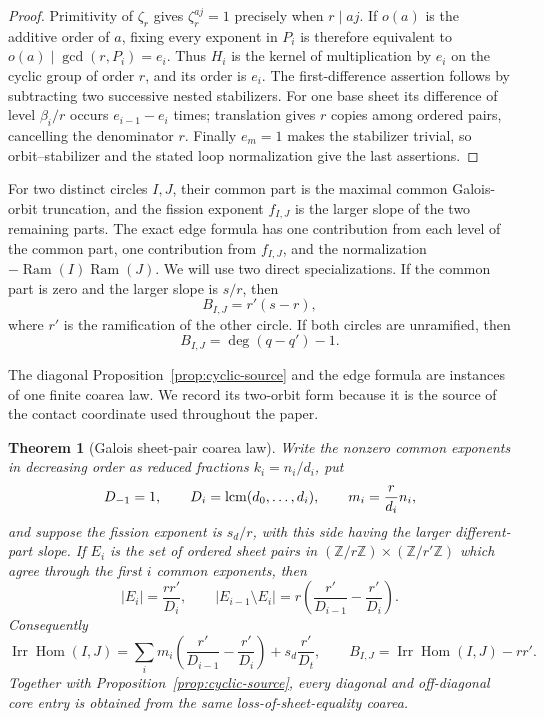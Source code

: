 \documentclass[11pt,a4paper]{amsart}
\theoremstyle{plain}
\newtheorem{theorem}{Theorem}[section]
\theoremstyle{definition}
\newcommand{\ZZ}{\mathbb Z}
\newcommand{\Ram}{\operatorname{Ram}}
\newcommand{\Irr}{\operatorname{Irr}}
\begin{document}
\begin{proof}
Primitivity of $\zeta_r$ gives $\zeta_r^{aj}=1$ precisely when $r\mid aj$.  If $o(a)$ is the
additive order of $a$, fixing every exponent in $P_i$ is therefore equivalent to
$o(a)\mid\gcd(r,P_i)=e_i$.  Thus $H_i$ is the kernel of multiplication by $e_i$ on the cyclic group
of order $r$, and its order is $e_i$.  The first-difference assertion follows by subtracting two
successive nested stabilizers.  For one base sheet its difference of level $\beta_i/r$ occurs
$e_{i-1}-e_i$ times; translation gives $r$ copies among ordered pairs, cancelling the denominator
$r$.  Finally $e_m=1$ makes the stabilizer trivial, so orbit--stabilizer and the stated loop
normalization give the last assertions.
\end{proof}

For two distinct circles $I,J$, their common part is the maximal common Galois-orbit truncation,
and the fission exponent $f_{I,J}$ is the larger slope of the two remaining parts.  The exact edge
formula \cite[Lemma~2.2]{Doucot2025Graphs} has one contribution from each level of the common part,
one contribution from $f_{I,J}$, and the normalization $-\Ram(I)\Ram(J)$.  We will use two direct
specializations.  If the common part is zero and the larger slope is $s/r$, then
\begin{equation}\label{eq:zero-common-edge}
 B_{I,J}=r'(s-r),
\end{equation}
where $r'$ is the ramification of the other circle.  If both circles are unramified, then
\begin{equation}\label{eq:unramified-edge}
 B_{I,J}=\deg(q-q')-1.
\end{equation}

The diagonal Proposition~\ref{prop:cyclic-source} and the edge formula are instances of one finite
coarea law.  We record its two-orbit form because it is the source of the contact coordinate used
throughout the paper.

\begin{theorem}[Galois sheet-pair coarea law]\label{thm:sheet-pair-coarea}
Write the nonzero common exponents in decreasing order as reduced fractions
$k_i=n_i/d_i$, put
\[
 D_{-1}=1,\qquad D_i=\mathop{\rm lcm}(d_0,\ldots,d_i),
 \qquad m_i=\frac r{d_i}n_i,
\]
and suppose the fission exponent is $s_d/r$, with this side having the larger different-part
slope.  If $E_i$ is the set of ordered sheet pairs in
$(\ZZ/r\ZZ)\times(\ZZ/r'\ZZ)$ which agree through the first $i$ common exponents, then
\[
 |E_i|=\frac{rr'}{D_i},
 \qquad
 |E_{i-1}\setminus E_i|
 =r\left(\frac{r'}{D_{i-1}}-\frac{r'}{D_i}\right).
\]
Consequently
\begin{equation}\label{eq:pair-coarea-source}
 \Irr\!\operatorname{Hom}(I,J)
 =\sum_i m_i\left(\frac{r'}{D_{i-1}}-\frac{r'}{D_i}\right)
   +s_d\frac{r'}{D_t},
 \qquad
 B_{I,J}=\Irr\!\operatorname{Hom}(I,J)-rr'.
\end{equation}
Together with Proposition~\ref{prop:cyclic-source}, every diagonal and off-diagonal core entry is
obtained from the same loss-of-sheet-equality coarea.
\end{theorem}
\end{document}

